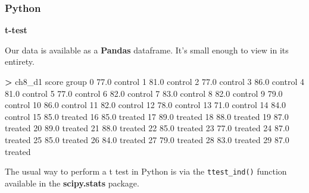 \documentclass[
]{book}
\newenvironment{Shaded}{\begin{snugshade}}{\end{snugshade}}
\newcommand{\DecValTok}[1]{\textcolor[rgb]{0.00,0.00,0.81}{#1}}
\newcommand{\FloatTok}[1]{\textcolor[rgb]{0.00,0.00,0.81}{#1}}
\newcommand{\NormalTok}[1]{#1}
\newcommand{\OperatorTok}[1]{\textcolor[rgb]{0.81,0.36,0.00}{\textbf{#1}}}
\begin{document}
\hypertarget{python-44}{%
\subsubsection*{Python}\label{python-44}}

\textbf{t-test}

Our data is available as a \textbf{Pandas} dataframe. It's small enough to view in its entirety.

\begin{Shaded}
\begin{Highlighting}[]
\OperatorTok{\textgreater{}}\NormalTok{ ch8\_d1}
\NormalTok{    score    group}
\DecValTok{0}    \FloatTok{77.0}\NormalTok{  control}
\DecValTok{1}    \FloatTok{81.0}\NormalTok{  control}
\DecValTok{2}    \FloatTok{77.0}\NormalTok{  control}
\DecValTok{3}    \FloatTok{86.0}\NormalTok{  control}
\DecValTok{4}    \FloatTok{81.0}\NormalTok{  control}
\DecValTok{5}    \FloatTok{77.0}\NormalTok{  control}
\DecValTok{6}    \FloatTok{82.0}\NormalTok{  control}
\DecValTok{7}    \FloatTok{83.0}\NormalTok{  control}
\DecValTok{8}    \FloatTok{82.0}\NormalTok{  control}
\DecValTok{9}    \FloatTok{79.0}\NormalTok{  control}
\DecValTok{10}   \FloatTok{86.0}\NormalTok{  control}
\DecValTok{11}   \FloatTok{82.0}\NormalTok{  control}
\DecValTok{12}   \FloatTok{78.0}\NormalTok{  control}
\DecValTok{13}   \FloatTok{71.0}\NormalTok{  control}
\DecValTok{14}   \FloatTok{84.0}\NormalTok{  control}
\DecValTok{15}   \FloatTok{85.0}\NormalTok{  treated}
\DecValTok{16}   \FloatTok{85.0}\NormalTok{  treated}
\DecValTok{17}   \FloatTok{89.0}\NormalTok{  treated}
\DecValTok{18}   \FloatTok{88.0}\NormalTok{  treated}
\DecValTok{19}   \FloatTok{87.0}\NormalTok{  treated}
\DecValTok{20}   \FloatTok{89.0}\NormalTok{  treated}
\DecValTok{21}   \FloatTok{88.0}\NormalTok{  treated}
\DecValTok{22}   \FloatTok{85.0}\NormalTok{  treated}
\DecValTok{23}   \FloatTok{77.0}\NormalTok{  treated}
\DecValTok{24}   \FloatTok{87.0}\NormalTok{  treated}
\DecValTok{25}   \FloatTok{85.0}\NormalTok{  treated}
\DecValTok{26}   \FloatTok{84.0}\NormalTok{  treated}
\DecValTok{27}   \FloatTok{79.0}\NormalTok{  treated}
\DecValTok{28}   \FloatTok{83.0}\NormalTok{  treated}
\DecValTok{29}   \FloatTok{87.0}\NormalTok{  treated}
\end{Highlighting}
\end{Shaded}

The usual way to perform a t test in Python is via the \texttt{ttest\_ind()} function available in the \textbf{scipy.stats} package.
\end{document}
